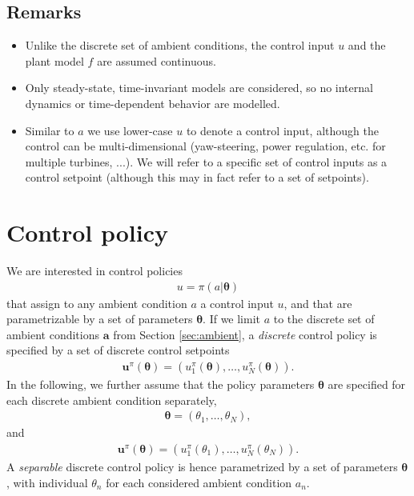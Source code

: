 \documentclass{article}
\begin{document}
\subsection*{Remarks}
\begin{itemize}
    \item Unlike the discrete set of ambient conditions, the control input $u$ and the plant model $f$ are assumed continuous.
    \item Only steady-state, time-invariant models are considered, so no internal dynamics or time-dependent behavior are modelled.
    \item Similar to $a$ we use lower-case $u$ to denote a control input, although the control can be multi-dimensional (yaw-steering, power regulation, etc. for multiple turbines, ...). We will refer to a specific set of control inputs as a control setpoint (although this may in fact refer to a set of setpoints).
\end{itemize}

\section{Control policy}
We are interested in control policies
\begin{align}
    u = \pi(a|\boldsymbol{\theta})
\end{align}
that assign to any ambient condition $a$ a control input $u$, and that are parametrizable by a set of parameters $\boldsymbol{\theta}$. If we limit $a$ to the discrete set of ambient conditions $\boldsymbol{a}$ from Section \ref{sec:ambient}, a \textit{discrete} control policy is specified by a set of discrete control setpoints
\begin{align}
    \boldsymbol{u}^\pi(\boldsymbol{\theta}) = (u^\pi_1(\boldsymbol{\theta}), \dots, u^\pi_N(\boldsymbol{\theta})).
\end{align}
In the following, we further assume that the policy parameters $\boldsymbol{\theta}$ are specified for each discrete ambient condition separately,
\begin{align}
    \boldsymbol{\theta} = (\theta_1, \dots, \theta_N),
\end{align}
and
\begin{align}
    \boldsymbol{u}^\pi(\boldsymbol{\theta}) = (u^\pi_1(\theta_1), \dots, u^\pi_N(\theta_N)).
\end{align}
A \textit{separable} discrete control policy is hence parametrized by a set of parameters $\boldsymbol{\theta}$, with individual $\theta_n$ for each considered ambient condition $a_n$.
\end{document}
